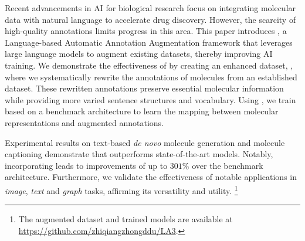 Recent advancements in AI for biological research focus on integrating molecular data with natural language to accelerate drug discovery. 
However, the scarcity of high-quality annotations limits progress in this area. 
% 
This paper introduces \pipeline, a Language-based Automatic Annotation Augmentation framework that leverages large language models to augment existing datasets, thereby improving AI training. 
We demonstrate the effectiveness of \pipeline by creating an enhanced dataset, \newdataset, where we systematically rewrite the annotations of molecules from an established dataset. 
These rewritten annotations preserve essential molecular information while providing more varied sentence structures and vocabulary. 
Using \newdataset, we train \newmodel based on a benchmark architecture to learn the mapping between molecular representations and augmented annotations.

Experimental results on text-based \emph{de novo} molecule generation and molecule captioning demonstrate that \newmodel outperforms state-of-the-art models. Notably, incorporating \pipeline leads to improvements of up to $301\%$ over the benchmark architecture.
% 
Furthermore, we validate the effectiveness of \pipeline notable applications in \emph{image}, \emph{text} and \emph{graph} tasks, affirming its versatility and utility.
\footnote{The augmented dataset and trained models are available at \url{https://github.com/zhiqiangzhongddu/LA3}.}
